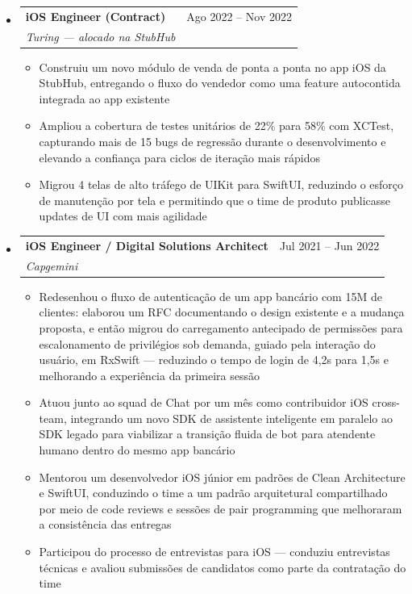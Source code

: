 \documentclass[11pt,letterpaper]{article}
\makeatletter
\newcommand{\resumeSubheading}[4]{
  \item
    \begin{tabular*}{\linewidth}{l@{\extracolsep{\fill}}r}
      \textbf{#1} & #2 \\
      \textit{#3} & \textit{#4} \\
    \end{tabular*}
}
\newcommand{\resumeItem}[1]{
  \item{#1}
}
\makeatother
\begin{document}
\begin{itemize}[leftmargin=0.15in]
    \resumeSubheading
        {iOS Engineer (Contract)}{Ago 2022 -- Nov 2022}
        {Turing --- alocado na StubHub}{}
        \begin{itemize}
            \resumeItem{Construiu um novo módulo de venda de ponta a ponta no app iOS da StubHub, entregando o fluxo do vendedor como uma feature autocontida integrada ao app existente}
            \resumeItem{Ampliou a cobertura de testes unitários de 22\% para 58\% com XCTest, capturando mais de 15 bugs de regressão durante o desenvolvimento e elevando a confiança para ciclos de iteração mais rápidos}
            \resumeItem{Migrou 4 telas de alto tráfego de UIKit para SwiftUI, reduzindo o esforço de manutenção por tela e permitindo que o time de produto publicasse updates de UI com mais agilidade}
        \end{itemize}

    \resumeSubheading
        {iOS Engineer / Digital Solutions Architect}{Jul 2021 -- Jun 2022}
        {Capgemini}{}
        \begin{itemize}
            \resumeItem{Redesenhou o fluxo de autenticação de um app bancário com 15M de clientes: elaborou um RFC documentando o design existente e a mudança proposta, e então migrou do carregamento antecipado de permissões para escalonamento de privilégios sob demanda, guiado pela interação do usuário, em RxSwift — reduzindo o tempo de login de 4,2s para 1,5s e melhorando a experiência da primeira sessão}
            \resumeItem{Atuou junto ao squad de Chat por um mês como contribuidor iOS cross-team, integrando um novo SDK de assistente inteligente em paralelo ao SDK legado para viabilizar a transição fluida de bot para atendente humano dentro do mesmo app bancário}
            \resumeItem{Mentorou um desenvolvedor iOS júnior em padrões de Clean Architecture e SwiftUI, conduzindo o time a um padrão arquitetural compartilhado por meio de code reviews e sessões de pair programming que melhoraram a consistência das entregas}
            \resumeItem{Participou do processo de entrevistas para iOS --- conduziu entrevistas técnicas e avaliou submissões de candidatos como parte da contratação do time}
        \end{itemize}


\end{itemize}
\end{document}
